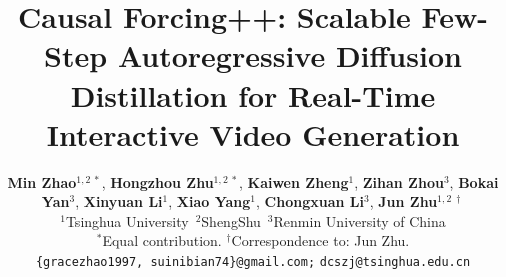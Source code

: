 \documentclass[10pt, logo, onecolumn]{shengshu}
\title{Causal Forcing++: Scalable Few-Step Autoregressive Diffusion Distillation for Real-Time Interactive Video Generation}
\author{%
  \textbf{Min Zhao}$^{1,2~*}$, \textbf{Hongzhou Zhu}$^{1,2~*}$, \textbf{Kaiwen Zheng}$^{1}$, \textbf{Zihan Zhou}$^{3}$,
  \textbf{Bokai Yan}$^{3}$, \textbf{Xinyuan Li}$^{1}$, \textbf{Xiao Yang}$^{1}$, 
  \textbf{Chongxuan Li}$^{3}$, \textbf{Jun Zhu}$^{1,2~\dagger}$\\
  $^1$Tsinghua University\,
  $^2$ShengShu\,
  $^3$Renmin University of China\\
  {\small $^*$Equal contribution. \quad $^\dagger$Correspondence to: Jun Zhu.}\\
\texttt{\{gracezhao1997, suinibian74\}@gmail.com;}
\texttt{dcszj@tsinghua.edu.cn}
}
\begin{document}
\maketitle







\clearpage

{
  \small
  
  
}
\end{document}
